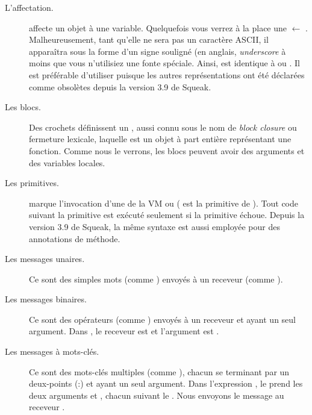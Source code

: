 \documentclass[a4paper,10pt,twoside]{book}
\begin{document}
\begin{description}
\item[L'affectation.]	\ct{:=} affecte un objet \`{a} une variable.
Quelquefois vous verrez \`{a} la place une $\leftarrow$ .
Malheureusement, tant qu'elle ne sera pas un caract\`{e}re
\textsc{ASCII}, il apparaîtra sous la forme d'un signe souligné (en
anglais, \emph{underscore} \`{a} moins que vous n'utilisiez une fonte 
sp\'{e}ciale.
Ainsi,  est identique \`{a}  ou . Il est préférable d'utiliser  \ct{:=} puisque les autres repr\'{e}sentations ont \'{e}t\'{e} déclarées comme obsolètes depuis la version 3.9 de Squeak.

\item[Les blocs.] Des crochets \ct{[ ]} définissent un ,
  aussi connu sous le nom de \emph{block closure} ou fermeture lexicale, laquelle est un objet \`{a} part enti\`{e}re repr\'{e}sentant une fonction.
Comme nous le verrons, les blocs peuvent avoir des arguments et des variables locales.

\item[Les primitives.]	 marque l'invocation
  d'une  de la VM ou 
( est la primitive de ).
Tout code suivant la primitive est ex\'{e}cut\'{e} seulement si la primitive \'{e}choue. Depuis la version 3.9 de Squeak, la m\^{e}me syntaxe est aussi employ\'{e}e pour des annotations de m\'{e}thode.

\item[Les messages unaires.] Ce sont des simples mots (comme ) envoy\'{e}s \`{a} un receveur (comme ).

\item[Les messages binaires.] Ce sont des op\'{e}rateurs (comme \ct{+}) envoy\'{e}s \`{a} un receveur et ayant un seul argument. Dans , le receveur est  et l'argument est .

\item[Les messages \`{a} mots-cl\'{e}s.] Ce sont des mots-cl\'{e}s multiples (comme ), chacun se terminant par un deux-points (:) et ayant un seul argument. 
Dans l'expression , le   prend les deux arguments  et , chacun suivant le \lct{:}. Nous envoyons le message au receveur .


\end{description}
\end{document}
